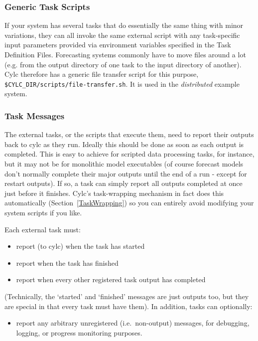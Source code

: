 \documentclass[11pt,a4paper]{article}
\begin{document}
\subsubsection{Generic Task Scripts}

If your system has several tasks that do essentially the same thing with
minor variations, they can all invoke the same external script with 
any task-specific input parameters provided via environment variables
specified in the Task Definition Files. Forecasting systems commonly
have to move files around a lot (e.g. from the output directory of one
task to the input directory of another). Cylc therefore has a generic
file transfer script for this purpose,
\lstinline=$CYLC_DIR/scripts/file-transfer.sh=. It is used in the
{\em distributed} example system. 

\subsubsection{Task Messages}

The external tasks, or the scripts that execute them, need to report
their outputs back to cylc as they run. Ideally this should be done as
soon as each output is completed. This is easy to achieve for scripted
data processing tasks, for instance, but it may not be for monolithic
model executables (of course forecast models don't normally complete
their major outputs until the end of a run - except for restart
outputs). If so, a task can simply report all outputs completed at once
just before it finishes.  Cylc's task-wrapping mechanism in fact does
this automatically (Section~\ref{TaskWrapping}) so you can entirely
avoid modifying your system scripts if you like.

Each external task must:

\begin{itemize}
\item report (to cylc) when the task has started
\item report when the task has finished
\item report when every other registered task output has
completed
\end{itemize}

(Technically, the `started' and `finished' messages are just
outputs too, but they are special in that every task
must have them). In addition, tasks can optionally:

\begin{itemize}
\item report any arbitrary unregistered (i.e.\ non-output)
messages, for debugging, logging, or progress monitoring purposes.
\end{itemize}
\end{document}
